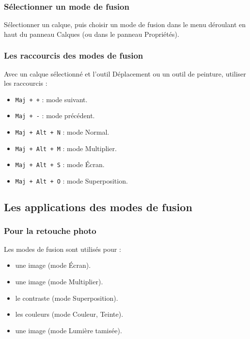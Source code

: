 \subsubsection{Sélectionner un mode de fusion}

Sélectionner un calque, puis choisir un mode de fusion dans le menu déroulant en haut du panneau Calques (ou dans le panneau Propriétés).

\subsubsection{Les raccourcis des modes de fusion}

Avec un calque sélectionné et l'outil Déplacement ou un outil de peinture, utiliser les raccourcis :

\begin{itemize}
    \item \texttt{Maj + +} : mode suivant.
    \item \texttt{Maj + -} : mode précédent.
    \item \texttt{Maj + Alt + N} : mode Normal.
    \item \texttt{Maj + Alt + M} : mode Multiplier.
    \item \texttt{Maj + Alt + S} : mode Écran.
    \item \texttt{Maj + Alt + O} : mode Superposition.
\end{itemize}

\subsection{Les applications des modes de fusion}

\subsubsection{Pour la retouche photo}

Les modes de fusion sont utilisés pour :

\begin{itemize}
    \item {} une image (mode Écran).
    \item {} une image (mode Multiplier).
    \item {} le contraste (mode Superposition).
    \item {} les couleurs (mode Couleur, Teinte).
    \item {} une image (mode Lumière tamisée).
\end{itemize}

